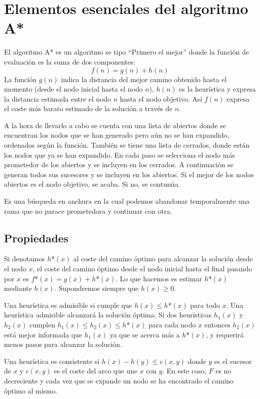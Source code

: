 \documentclass[12pt]{article}
\begin{document}
\section{Elementos esenciales del algoritmo A*}

El algoritmo A* es un algoritmo se tipo ``Primero el mejor'' donde la
función de evaluación es la suma de dos componentes:$$f(n)=g(n)+h(n)$$
La función $g(n)$ indica la distancia del mejor camino obtenido hasta
el momento (desde el nodo inicial hasta el nodo $n$), $h(n)$ es la
heurística y expresa la distancia estimada entre el nodo $n$ hasta el
nodo objetivo. Así $f(n)$ expresa el coste más barato estimado de la
solución a través de $n$.

A la hora de llevarlo a cabo se cuenta con una lista de abiertos donde
se encuentran los nodos que se han generado pero aún no se han
expandido, ordenados según la función. También se tiene una lista de
cerrados, donde están los nodos que ya se han expandido. En cada paso
se selecciona el nodo más prometedor de los abiertos y se incluyen en
los cerrados. A continuación se generan todos sus sucesores y se
incluyen en los abiertos. Si el mejor de los nodos abiertos es el nodo
objetivo, se acaba. Si no, se contunúa.

Es una búsqueda en anchura en la cual podemos abandonar temporalmente
una rama que no parace prometedora y continuar con otra.

\subsection{Propiedades}

Si denotamos $h$*$(x)$ al coste del camino óptimo para alcanzar la
solución desde el nodo $x$, el coste del camino óptimo desde el nodo
inicial hasta el final pasando por $x$ es $f$*$(x)=g(x)+h$*$(x)$. Lo
que hacemos es estimar $h$*$(x)$ mediante $h(x)$. Supondremos siempre
que $h(x)\geq 0$.

Una heurística es admisible si cumple que $h(x) \leq h$*$(x)$ para
todo $x$. Una heurística admisible alcanzará la solución óptima. Si
dos heurísticas $h_1(x)$ y $h_2(x)$ cumplen
$h_1(x) \leq h_2(x) \leq h$*$(x)$ para cada nodo $x$ entonces $h_2(x)$
está mejor informada que $h_1(x)$ ya que se acerca más a $h$*$(x)$, y
requerirá menos pasos para alcanzar la solución.

Una heurística es consistente si $h(x) - h(y) \leq c(x,y)$ donde $y$
es el sucesor de $x$ y $c(x,y)$ es el coste del arco que une $x$ con
$y$. En este caso, $F$ es no decreciente y cada vez que se expande un
nodo se ha encontrado el camino óptimo al mismo.
\end{document}
